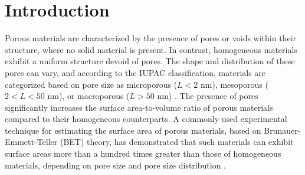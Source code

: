 
\section{Introduction}
\label{section:introduction}

Porous materials are characterized by the presence of pores or voids within their structure, where no solid material is present. 
In contrast, homogeneous materials exhibit a uniform structure devoid of pores. The shape and distribution of these pores can vary, 
and according to the IUPAC classification, materials are categorized based on pore size as microporous ($L < 2$ nm), 
mesoporous ($2 < L < 50$ nm), or macroporous ($L > 50$ nm) \cite{sing_reporting_1985}. The presence of pores significantly 
increases the surface area-to-volume ratio of porous materials compared to their homogeneous counterparts. A commonly used experimental 
technique for estimating the surface area of porous materials, based on Brunauer-Emmett-Teller (BET) theory, has demonstrated that such 
materials can exhibit surface areas more than a hundred times greater than those of homogeneous materials, depending on pore size and pore 
size distribution \cite{shimizu_surface_2022}.  

